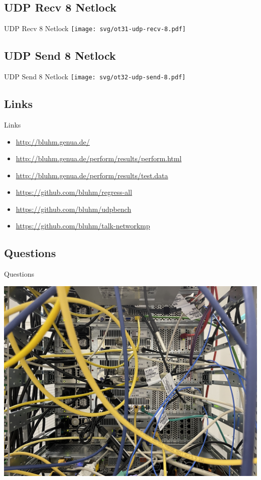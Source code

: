 \documentclass[14pt,aspectratio=169]{beamer}
\begin{document}
\subsection{UDP Recv 8 Netlock}
\begin{frame}{UDP Recv 8 Netlock}
    \texttt{[image: svg/ot31-udp-recv-8.pdf]}
\end{frame}

\subsection{UDP Send 8 Netlock}
\begin{frame}{UDP Send 8 Netlock}
    \texttt{[image: svg/ot32-udp-send-8.pdf]}
\end{frame}

\subsection{Links}
\begin{frame}{Links}
\begin{itemize}
    \small
    \item \url{http://bluhm.genua.de/}
    \item \url{http://bluhm.genua.de/perform/results/perform.html}
    \item \url{http://bluhm.genua.de/perform/results/test.data}
    \item \url{https://github.com/bluhm/regress-all}
    \item \url{https://github.com/bluhm/udpbench}
    \item \url{https://github.com/bluhm/talk-networkmp}
\end{itemize}
\end{frame}

\subsection{Questions}
\begin{frame}{Questions}
\begin{center}
    \includegraphics[width=\textwidth,trim=0 8cm 0 2cm,clip]
        {images/lt13-ot14-ot15-lt16.jpg}
\end{center}
\end{frame}
\end{document}
